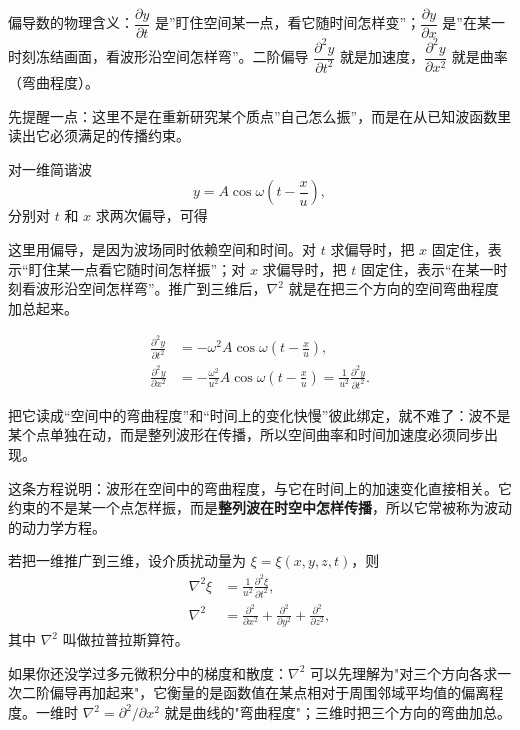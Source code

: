 \documentclass[lang=cn,11pt]{elegantbook}
\newcommand{\bridge}[1]{\begin{note}#1\end{note}}
\begin{document}
\begin{remark}
偏导数的物理含义：\(\dfrac{\partial y}{\partial t}\) 是”盯住空间某一点，看它随时间怎样变”；\(\dfrac{\partial y}{\partial x}\) 是”在某一时刻冻结画面，看波形沿空间怎样弯”。二阶偏导 \(\dfrac{\partial^2 y}{\partial t^2}\) 就是加速度，\(\dfrac{\partial^2 y}{\partial x^2}\) 就是曲率（弯曲程度）。
\end{remark}

先提醒一点：这里不是在重新研究某个质点”自己怎么振”，而是在从已知波函数里读出它必须满足的传播约束。

对一维简谐波
\[
y=A\cos\omega\left(t-\frac{x}{u}\right),
\]
分别对 \(t\) 和 \(x\) 求两次偏导，可得
\begin{note}
这里用偏导，是因为波场同时依赖空间和时间。对 \(t\) 求偏导时，把 \(x\) 固定住，表示“盯住某一点看它随时间怎样振”；对 \(x\) 求偏导时，把 \(t\) 固定住，表示“在某一时刻看波形沿空间怎样弯”。推广到三维后，\(\nabla^2\) 就是在把三个方向的空间弯曲程度加总起来。
\end{note}
\begin{align*}
\frac{\partial^2 y}{\partial t^2}
&=-\omega^2 A\cos\omega\left(t-\frac{x}{u}\right),\\
\frac{\partial^2 y}{\partial x^2}
&=-\frac{\omega^2}{u^2}A\cos\omega\left(t-\frac{x}{u}\right)
=\frac{1}{u^2}\frac{\partial^2 y}{\partial t^2}.
\end{align*}

把它读成“空间中的弯曲程度”和“时间上的变化快慢”彼此绑定，就不难了：波不是某个点单独在动，而是整列波形在传播，所以空间曲率和时间加速度必须同步出现。

这条方程说明：波形在空间中的弯曲程度，与它在时间上的加速变化直接相关。它约束的不是某一个点怎样振，而是\textbf{整列波在时空中怎样传播}，所以它常被称为波动的动力学方程。

若把一维推广到三维，设介质扰动量为 \(\xi=\xi(x,y,z,t)\)，则
\begin{align*}
\nabla^2\xi&=\frac{1}{u^2}\frac{\partial^2 \xi}{\partial t^2},\\
\nabla^2&=\frac{\partial^2}{\partial x^2}
+\frac{\partial^2}{\partial y^2}
+\frac{\partial^2}{\partial z^2},
\end{align*}
其中 \(\nabla^2\) 叫做拉普拉斯算符。

\bridge{如果你还没学过多元微积分中的梯度和散度：\(\nabla^2\) 可以先理解为"对三个方向各求一次二阶偏导再加起来"，它衡量的是函数值在某点相对于周围邻域平均值的偏离程度。一维时 \(\nabla^2=\partial^2/\partial x^2\) 就是曲线的"弯曲程度"；三维时把三个方向的弯曲加总。}
\end{document}
